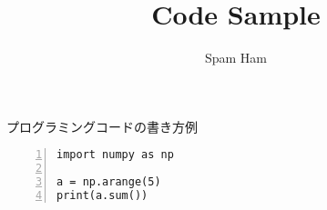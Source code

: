 \documentclass[10pt]{jsarticle}
\begin{document}
  \title{Code Sample}
  \author{Spam Ham}
  \date{}	
  \maketitle
  プログラミングコードの書き方例
  \begin{lstlisting}[basicstyle=\ttfamily, frame=single,numbers=left]
import numpy as np

a = np.arange(5)
print(a.sum())
  \end{lstlisting}
\end{document}
